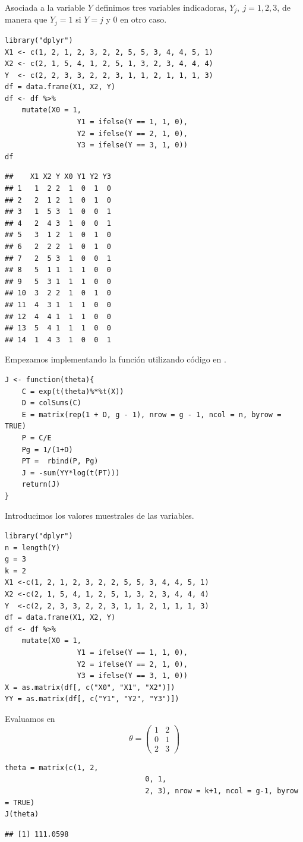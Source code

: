 Asociada a la variable $Y$ definimos tres variables indicadoras, $Y_j,\:j=1,2,3$, de manera que $Y_j=1$ si $Y=j$ y 0 en otro caso.
\begin{lstlisting}
library("dplyr")
X1 <- c(1, 2, 1, 2, 3, 2, 2, 5, 5, 3, 4, 4, 5, 1)
X2 <- c(2, 1, 5, 4, 1, 2, 5, 1, 3, 2, 3, 4, 4, 4)
Y  <- c(2, 2, 3, 3, 2, 2, 3, 1, 1, 2, 1, 1, 1, 3)
df = data.frame(X1, X2, Y)
df <- df %>%
	mutate(X0 = 1,
				 Y1 = ifelse(Y == 1, 1, 0),
				 Y2 = ifelse(Y == 2, 1, 0),
				 Y3 = ifelse(Y == 3, 1, 0))
df
\end{lstlisting}
\begin{verbatim}
##    X1 X2 Y X0 Y1 Y2 Y3
## 1   1  2 2  1  0  1  0
## 2   2  1 2  1  0  1  0
## 3   1  5 3  1  0  0  1
## 4   2  4 3  1  0  0  1
## 5   3  1 2  1  0  1  0
## 6   2  2 2  1  0  1  0
## 7   2  5 3  1  0  0  1
## 8   5  1 1  1  1  0  0
## 9   5  3 1  1  1  0  0
## 10  3  2 2  1  0  1  0
## 11  4  3 1  1  1  0  0
## 12  4  4 1  1  1  0  0
## 13  5  4 1  1  1  0  0
## 14  1  4 3  1  0  0  1
\end{verbatim}
Empezamos implementando la función  utilizando código en .
\begin{lstlisting}
J <- function(theta){
	C = exp(t(theta)%*%t(X))
	D = colSums(C)
	E = matrix(rep(1 + D, g - 1), nrow = g - 1, ncol = n, byrow = TRUE)
	P = C/E
	Pg = 1/(1+D)
	PT =  rbind(P, Pg)
	J = -sum(YY*log(t(PT)))
	return(J)
}
\end{lstlisting}
Introducimos los valores muestrales de las variables.
\begin{lstlisting}
library("dplyr")
n = length(Y)
g = 3
k = 2
X1 <-c(1, 2, 1, 2, 3, 2, 2, 5, 5, 3, 4, 4, 5, 1)
X2 <-c(2, 1, 5, 4, 1, 2, 5, 1, 3, 2, 3, 4, 4, 4)
Y  <-c(2, 2, 3, 3, 2, 2, 3, 1, 1, 2, 1, 1, 1, 3)
df = data.frame(X1, X2, Y)
df <- df %>%
	mutate(X0 = 1,
				 Y1 = ifelse(Y == 1, 1, 0),
				 Y2 = ifelse(Y == 2, 1, 0),
				 Y3 = ifelse(Y == 3, 1, 0))
X = as.matrix(df[, c("X0", "X1", "X2")])
YY = as.matrix(df[, c("Y1", "Y2", "Y3")])
\end{lstlisting}

Evaluamos en \[ \theta=\begin{pmatrix}
	1 & 2\\
	0 & 1\\
	2 & 3
\end{pmatrix} \]
\begin{lstlisting}
theta = matrix(c(1, 2,
								 0, 1,
								 2, 3), nrow = k+1, ncol = g-1, byrow = TRUE)
J(theta)
\end{lstlisting}
\begin{verbatim}
## [1] 111.0598
\end{verbatim}


